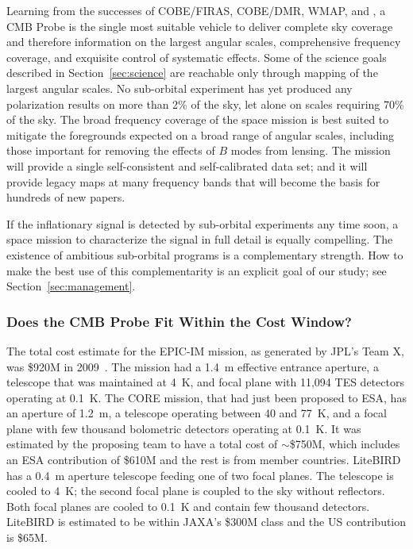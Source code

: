 Learning from the successes of COBE/FIRAS, COBE/DMR, WMAP, and \planck, a
CMB Probe is the single most suitable vehicle to deliver complete sky coverage 
and therefore information on the largest angular scales, 
comprehensive frequency coverage, and exquisite control of systematic effects. 
Some of the science goals described in Section~\ref{sec:science} 
are reachable only through mapping of the largest angular scales. No sub-orbital experiment 
has yet produced any polarization results on more than 2\% of the sky, let alone 
on scales requiring 70\% of the sky. The broad frequency coverage of the space 
mission is best suited to mitigate the foregrounds expected on a broad range of angular 
scales, including those important for removing the effects of $B$ modes from lensing. 
The mission will provide a single self-consistent and self-calibrated data set;  and it  
will provide legacy maps at many frequency bands that will become the basis for 
hundreds of new papers. 

If the inflationary signal is detected by sub-orbital experiments
any time soon, a space mission to characterize the signal in full detail is equally compelling. 
The existence of ambitious sub-orbital programs is a complementary strength. How 
to make the best use of this complementarity is an explicit goal of our study; 
see Section~\ref{sec:management}.

\vspace{-0.18in}

\subsubsection{Does the CMB Probe Fit Within the Cost Window?} 

\vspace{-0.05in}

The total cost estimate for the EPIC-IM mission, as generated by JPL's Team X, was \$920M in 2009~\cite{bock2009}. 
The mission had a 1.4~m effective entrance aperture, a telescope that was maintained
at 4~K, and focal plane with 11,094 TES detectors operating at 0.1~K.  The CORE mission, that had just been 
proposed to ESA, has an aperture of 1.2~m, a telescope operating 
between 40 and 77~K, and a focal plane with few thousand bolometric detectors operating at 0.1~K. 
It was estimated by the proposing team to have a total cost of $\sim$\$750M, which includes 
an ESA contribution of \$610M and the rest is from member countries.  
LiteBIRD has a 0.4~m aperture telescope feeding one of two focal planes. The telescope 
is cooled to 4~K; the second focal plane is coupled to the sky without reflectors. Both focal planes are cooled to 
0.1~K and contain few thousand detectors. LiteBIRD is estimated to be within JAXA's \$300M class and the 
US contribution is \$65M.  

